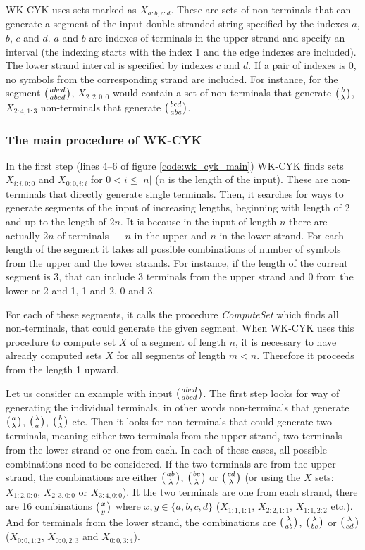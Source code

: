 WK-CYK uses sets marked as $X_{a:b,c:d}$. These are sets of non-terminals that can generate a segment of the input double stranded string specified by the indexes $a$, $b$, $c$ and $d$. $a$ and $b$ are indexes of terminals in the upper strand and specify an interval (the indexing starts with the index 1 and the edge indexes are included). The lower strand interval is specified by indexes $c$ and $d$. If a pair of indexes is 0, no symbols from the corresponding strand are included. For instance, for the segment $\wkpair{abcd}{abcd}$, $X_{2:2,0:0}$ would contain a set of non-terminals that generate $\wkpair{b}{\lambda}$, $X_{2:4,1:3}$ non-terminals that generate $\wkpair{bcd}{abc}$.

\subsubsection{The main procedure of WK-CYK}
In the first step (lines 4--6 of figure \ref{code:wk_cyk_main}) WK-CYK finds sets $X_{i:i,0:0}$ and $X_{0:0,i:i}$ for $0 < i \leq |n|$ ($n$ is the length of the input). These are non-terminals that directly generate single terminals. Then, it searches for ways to generate segments of the input of increasing lengths, beginning with length of 2 and up to the length of $2n$. It is because in the input of length $n$ there are actually $2n$ of terminals --- $n$ in the upper and $n$ in the lower strand. For each length of the segment it takes all possible combinations of number of symbols from the upper and the lower strands. For instance, if the length of the current segment is 3, that can include 3 terminals from the upper strand and 0 from the lower or 2 and 1, 1 and 2, 0 and 3.

For each of these segments, it calls the procedure \textit{ComputeSet} which finds all non-terminals, that could generate the given segment. When WK-CYK uses this procedure to compute set $X$ of a segment of length $n$, it is necessary to have already computed sets $X$ for all segments of length $m < n$. Therefore it proceeds from the length 1 upward.

Let us consider an example with input $\wkpair{abcd}{abcd}$. The first step looks for way of generating the individual terminals, in other words non-terminals that generate $\wkpair{a}{\lambda}$, $\wkpair{\lambda}{a}$, $\wkpair{b}{\lambda}$ etc. Then it looks for non-terminals that could generate two terminals, meaning either two terminals from the upper strand, two terminals from the lower strand or one from each. In each of these cases, all possible combinations need to be considered. If the two terminals are from the upper strand, the combinations are either $\wkpair{ab}{\lambda}$, $\wkpair{bc}{\lambda}$ or $\wkpair{cd}{\lambda}$ (or using the $X$ sets: $X_{1:2,0:0}$, $X_{2:3,0:0}$ or $X_{3:4,0:0}$). It the two terminals are one from each strand, there are 16 combinations $\wkpair{x}{y}$ where $x, y \in \{a, b, c, d\}$ ($X_{1:1,1:1}$, $X_{2:2,1:1}$, $X_{1:1,2:2}$ etc.). And for terminals from the lower strand, the combinations are $\wkpair{\lambda}{ab}$, $\wkpair{\lambda}{bc}$ or $\wkpair{\lambda}{cd}$ ($X_{0:0,1:2}$, $X_{0:0,2:3}$ and $X_{0:0,3:4}$).

